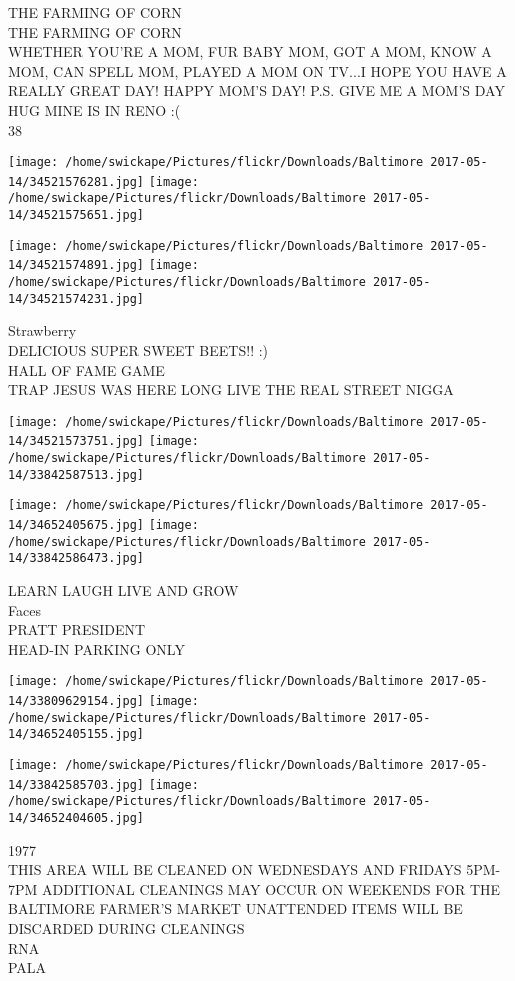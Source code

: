 \documentclass[10pt,letterpaper]{article}
\begin{document}
THE FARMING OF CORN\\
THE FARMING OF CORN\\
WHETHER YOU'RE A MOM, FUR BABY MOM, GOT A MOM, KNOW A MOM, CAN SPELL MOM, PLAYED A MOM ON TV...I HOPE YOU HAVE A REALLY GREAT DAY!  HAPPY MOM'S DAY!  P.S. GIVE ME A MOM'S DAY HUG MINE IS IN RENO :(\\
38
\pagebreak

\texttt{[image: /home/swickape/Pictures/flickr/Downloads/Baltimore 2017-05-14/34521576281.jpg]}
\texttt{[image: /home/swickape/Pictures/flickr/Downloads/Baltimore 2017-05-14/34521575651.jpg]}

\texttt{[image: /home/swickape/Pictures/flickr/Downloads/Baltimore 2017-05-14/34521574891.jpg]}
\texttt{[image: /home/swickape/Pictures/flickr/Downloads/Baltimore 2017-05-14/34521574231.jpg]}

Strawberry\\
DELICIOUS SUPER SWEET BEETS!! :)\\
HALL OF FAME GAME\\
TRAP JESUS WAS HERE LONG LIVE THE REAL STREET NIGGA
\pagebreak

\texttt{[image: /home/swickape/Pictures/flickr/Downloads/Baltimore 2017-05-14/34521573751.jpg]}
\texttt{[image: /home/swickape/Pictures/flickr/Downloads/Baltimore 2017-05-14/33842587513.jpg]}

\texttt{[image: /home/swickape/Pictures/flickr/Downloads/Baltimore 2017-05-14/34652405675.jpg]}
\texttt{[image: /home/swickape/Pictures/flickr/Downloads/Baltimore 2017-05-14/33842586473.jpg]}

LEARN LAUGH LIVE AND GROW\\
Faces\\
PRATT PRESIDENT\\
HEAD{-}IN PARKING ONLY
\pagebreak

\texttt{[image: /home/swickape/Pictures/flickr/Downloads/Baltimore 2017-05-14/33809629154.jpg]}
\texttt{[image: /home/swickape/Pictures/flickr/Downloads/Baltimore 2017-05-14/34652405155.jpg]}

\texttt{[image: /home/swickape/Pictures/flickr/Downloads/Baltimore 2017-05-14/33842585703.jpg]}
\texttt{[image: /home/swickape/Pictures/flickr/Downloads/Baltimore 2017-05-14/34652404605.jpg]}

1977\\
THIS AREA WILL BE CLEANED ON WEDNESDAYS AND FRIDAYS 5PM{-}7PM ADDITIONAL CLEANINGS MAY OCCUR ON WEEKENDS FOR THE BALTIMORE FARMER'S MARKET UNATTENDED ITEMS WILL BE DISCARDED DURING CLEANINGS\\
RNA\\
PALA
\pagebreak
\end{document}
